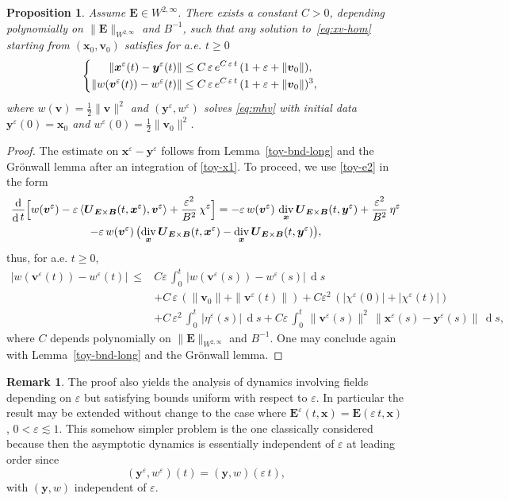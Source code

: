 \documentclass[JEP,XML,SOM,Unicode]{cedram}
\newenvironment{splitcases}
{\begin{cases}\begin{aligned}}
{\end{aligned}\end{cases}}
\let\eps\varepsilon
\DeclareMathOperator\dD{d}\let\dd\dD
\DeclareMathOperator{\Div}{div}
\theoremstyle{plain}
\newtheorem{proposition}[theorem]{Proposition}
\theoremstyle{definition}
\newtheorem{remark}[theorem]{Remark}
\newcommand\br{\begin{remark}}
\newcommand\er{\end{remark}}
\newcommand{\bpr}{\begin{proposition}}
\newcommand{\epr}{\end{proposition}}
\newcommand\bB{{\boldsymbol B}}
\newcommand\bE{{\boldsymbol E}}
\newcommand\bU{{\boldsymbol U}}
\newcommand\bfv{{\boldsymbol v}}
\newcommand\bfx{{\boldsymbol x}}
\newcommand\bfy{{\boldsymbol y}}
\let\e w
\newcommand{\EcB}{\bU_{\bE\times\bB}}
\begin{document}
\bpr
\label{toy-long-xe}
Assume $\bE\in W^{2,\infty}$. There exists a constant $C>0$, depending polynomially on $\|\bE\|_{W^{2,\infty}}$ and $B^{-1}$, such that any solution to~\eqref{eq:xv-hom} starting from $(\bfx_0,\bfv_0)$ satisfies for a.e. $t\geq0$
\[
\begin{splitcases}
\|\bfx^\eps(t)-\bfy^\eps(t)\|
&\leq C\,\eps\,e^{C\,\eps\,t}
\,(1+\eps+\|\bfv_0\|),
\\
\|\e(\bfv^\eps(t))-\e^\eps(t)\| &\leq C\,\eps\,e^{C\,\eps\,t}\,(1+\eps+\|\bfv_0\|)^3,
\end{splitcases}
\]
where $\e(\bfv)=\tfrac12\|\bfv\|^2$ and
$(\bfy^\eps,\e^\eps)$ solves \eqref{eq:mhv} with initial data
$\bfy^\eps(0)=\bfx_0$ and $\e^\eps(0)=\tfrac12\|\bfv_0\|^2$.
\epr
\begin{proof}
The estimate on $\bfx^\eps-\bfy^\eps$ follows from Lemma~\ref{toy-bnd-long} and the Grönwall lemma after an integration of \eqref{toy-x1}. To proceed, we use \eqref{toy-e2} in the form
\begin{multline*}
\frac{\dD}{\dD
t}\Bigl[\e(\bfv^\eps)-\eps\,\langle\EcB(t,\bfx^\eps),\bfv^\eps\rangle+\frac{\eps^2}{B^2}\,\chi^\eps\Bigr]
=-\eps\,\e(\bfv^\eps)\,\Div_\bfx\EcB(t,\bfy^\eps)+\frac{\eps^2}{B^2}\,\eta^\eps
\\
-\eps\,\e(\bfv^\eps)\,\bigl(\Div_\bfx\EcB(t,\bfx^\eps)-\Div_\bfx\EcB(t,\bfy^\eps)\bigr),
\end{multline*}
thus, for a.e. $t\geq0$,
\begin{align*}
|\e(\bfv^\eps(t))-\e^\eps(t)|\
\leq {}&C\eps\,\int_0^t\,|\e(\bfv^\eps(s))-\e^\eps(s)|\,\dD s\,
\\
&+C\,\eps\,(\|\bfv_0\|+\|\bfv^\eps(t)\|)+C\eps^2\,(|\chi^\eps(0)|+|\chi^\eps(t)|)\,
\\
& +C\,\eps^2\,\int_0^t\,|\eta^\eps(s)|\,\dD s
+C\eps\,\int_0^t\,\|\bfv^\eps(s)\|^2\,\|\bfx^\eps(s)-\bfy^\eps(s)\|\,\dD s,
\end{align*}
where $C$ depends polynomially on $\|\bE\|_{W^{2,\infty}}$ and $B^{-1}$. One may conclude again with Lemma~\ref{toy-bnd-long} and the Grönwall lemma.
\end{proof}

\br
\label{rk:toy-scaled-time}
The proof also yields the analysis of dynamics involving fields depending on $\eps$ but satisfying bounds uniform with respect to $\eps$. In particular the result may be extended without change to the case where $\bE^\eps(t,\bfx)=\bE(\eps\,t,\bfx)$, $0<\eps\lesssim 1$. This somehow simpler problem is the one classically considered because then the asymptotic dynamics is essentially independent of $\eps$ at leading order since
\[
(\bfy^\eps,\e^\eps)(t)=(\bfy,\e)(\eps\,t),
\]
with $(\bfy,\e)$ independent of $\eps$.
\er
\end{document}
